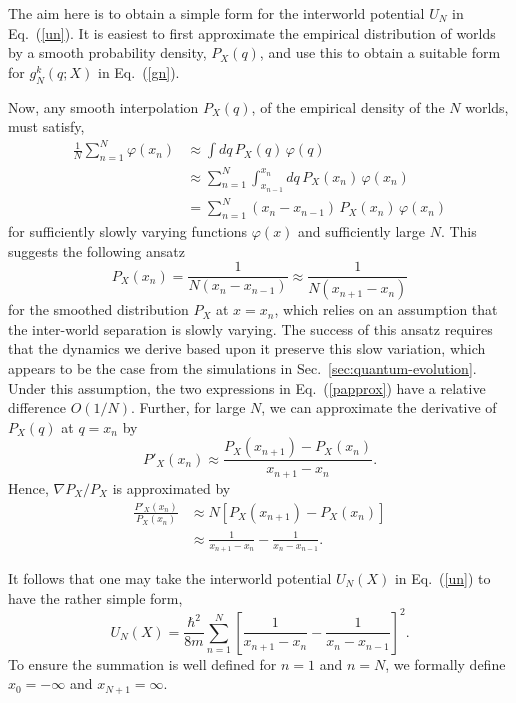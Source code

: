 \documentclass[twocolumn,aps,pra,amsmath,amssymb,superscriptaddress]{revtex4}
\newcommand{\erf}[1]{Eq.~(\ref{#1})}
\renewcommand{\(}{\left(}
\renewcommand{\)}{\right)}
\newcommand{\blk}{\color{black}}
\newcommand{\blu}{\color{blue}}
\renewcommand\blu{\blk}
\begin{document}
The aim here is to obtain a simple form for the interworld potential $U_N$ in Eq.~(\ref{un}).  It is easiest to first approximate the empirical distribution of worlds by a smooth probability density, $P_{X}(q)$, and use this to obtain a suitable form for $g_N^k({q} ;{X})$ in Eq.~(\ref{gn}).

Now, any smooth interpolation $P_{X}(q)$, of the empirical density of the $N$ worlds, must satisfy,
\begin{align*} 
\frac{1}{N} \sum_{n=1}^N { \varphi}(x_n) &\approx \int dq\,P_{X}(q)\,{ \varphi}(q)\\
&\approx \sum_{n=1}^N \int_{x_{n-1}}^{x_{n}} dq\, P_{X}(x_n)\,{ \varphi}(x_n)\\
& = \sum_{n=1}^N (x_{n}-x_{n-1})\,P_{X}(x_n)\,{ \varphi}(x_n)
\end{align*}
 for sufficiently slowly varying functions ${ \varphi}(x)$ 
 and sufficiently large $N$.
 This suggests the following ansatz  
\begin{equation} \label{papprox}
 P_{X}(x_n) = \frac{1}{N(x_{n}-x_{n-1})} \approx \frac{1}{N(x_{n+1}-x_n)} 
\end{equation}
for the smoothed distribution $P_X$ \blu at $x=x_n$, \blk  which relies on an assumption that the 
inter-world separation is slowly varying. The success of this ansatz requires that the dynamics 
we derive based upon it preserve this slow variation, which appears to be the case from 
the simulations in Sec.~\ref{sec:quantum-evolution}.  
Under this assumption, the two expressions in \erf{papprox} have a relative difference $O(1/N)$. 
Further, for large $N$, we can approximate the derivative of $P_{X}(q)$ at $q=x_n$ by
\begin{equation} \label{toygrad} 
P'_{X}(x_n)\approx \frac{P_{X}(x_{n+1}) - P_{X}(x_n)}{x_{n+1}-x_n}. 
\end{equation}
Hence, $\nabla P_{X}/P_{X}$ is approximated by
\begin{align*} 
\frac{P'_{X}(x_n)}{P_{X}(x_n)} &\approx N[P_{X}(x_{n+1}) - P_{X}(x_n)]\\
&\approx \frac{1}{x_{n+1}-x_n} - \frac{1}{x_{n}-x_{n-1}} .
\end{align*}

It follows that one may take the interworld potential $U_N({X})$ in Eq.~(\ref{un}) to have the rather simple form, 
\begin{equation} \label{un1d}
U_N({X}) = \frac{\hbar^2}{8m} \sum_{n=1}^N \left[ \frac{1}{x_{n+1}-x_n} - \frac{1}{x_{n}-x_{n-1}} \right]^2 .
\end{equation}
To ensure the summation is well defined for $n=1$ and $n=N$, we formally define $x_0=-\infty$ and $x_{N+1}=\infty$. 
\end{document}
